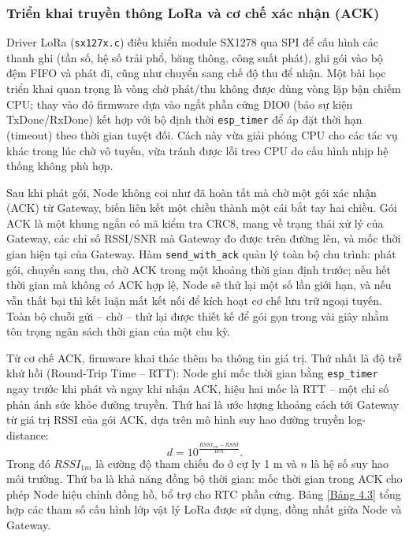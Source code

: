\subsubsection{Triển khai truyền thông LoRa và cơ chế xác nhận (ACK)}
Driver LoRa (\texttt{sx127x.c}) điều khiển module SX1278 qua SPI để cấu hình các thanh ghi (tần số, hệ số trải phổ, băng thông, công suất phát), ghi gói vào bộ đệm FIFO và phát đi, cũng như chuyển sang chế độ thu để nhận. Một bài học triển khai quan trọng là vòng chờ phát/thu không được dùng vòng lặp bận chiếm CPU; thay vào đó firmware dựa vào ngắt phần cứng DIO0 (báo sự kiện TxDone/RxDone) kết hợp với bộ định thời \texttt{esp\_timer} để áp đặt thời hạn (timeout) theo thời gian tuyệt đối. Cách này vừa giải phóng CPU cho các tác vụ khác trong lúc chờ vô tuyến, vừa tránh được lỗi treo CPU do cấu hình nhịp hệ thống không phù hợp.

Sau khi phát gói, Node không coi như đã hoàn tất mà chờ một gói xác nhận (ACK) từ Gateway, biến liên kết một chiều thành một cái bắt tay hai chiều. Gói ACK là một khung ngắn có mã kiểm tra CRC8, mang về trạng thái xử lý của Gateway, các chỉ số RSSI/SNR mà Gateway đo được trên đường lên, và mốc thời gian hiện tại của Gateway. Hàm \texttt{send\_with\_ack} quản lý toàn bộ chu trình: phát gói, chuyển sang thu, chờ ACK trong một khoảng thời gian định trước; nếu hết thời gian mà không có ACK hợp lệ, Node sẽ thử lại một số lần giới hạn, và nếu vẫn thất bại thì kết luận mất kết nối để kích hoạt cơ chế lưu trữ ngoại tuyến. Toàn bộ chuỗi gửi -- chờ -- thử lại được thiết kế để gói gọn trong vài giây nhằm tôn trọng ngân sách thời gian của một chu kỳ.

Từ cơ chế ACK, firmware khai thác thêm ba thông tin giá trị. Thứ nhất là độ trễ khứ hồi (Round-Trip Time -- RTT): Node ghi mốc thời gian bằng \texttt{esp\_timer} ngay trước khi phát và ngay khi nhận ACK, hiệu hai mốc là RTT -- một chỉ số phản ánh sức khỏe đường truyền. Thứ hai là ước lượng khoảng cách tới Gateway từ giá trị RSSI của gói ACK, dựa trên mô hình suy hao đường truyền log-distance:
\begin{equation}
    {d = 10^{\frac{RSSI_{1m} - RSSI}{10\,n}}}.
\end{equation}
Trong đó $RSSI_{1m}$ là cường độ tham chiếu đo ở cự ly 1 m và $n$ là hệ số suy hao môi trường. Thứ ba là khả năng đồng bộ thời gian: mốc thời gian trong ACK cho phép Node hiệu chỉnh đồng hồ, bổ trợ cho RTC phần cứng. Bảng \ref{Bảng 4.3} tổng hợp các tham số cấu hình lớp vật lý LoRa được sử dụng, đồng nhất giữa Node và Gateway.

